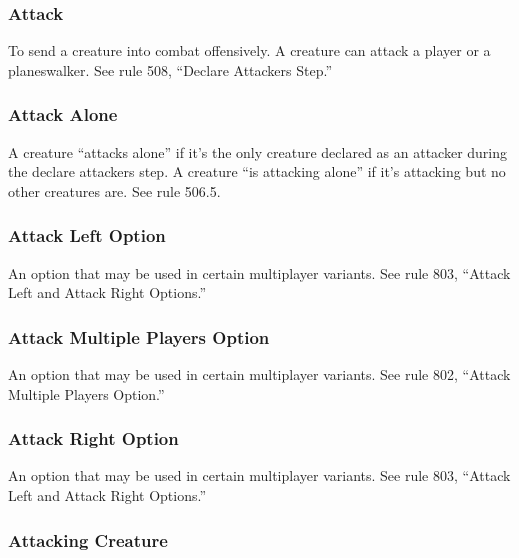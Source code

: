 {\subsubsection*{Attack}

To send a creature into combat offensively. A creature can attack a player or a planeswalker. See rule 508, “Declare Attackers Step.”

\subsubsection*{Attack Alone}

A creature “attacks alone” if it’s the only creature declared as an attacker during the declare attackers step. A creature “is attacking alone” if it’s attacking but no other creatures are. See rule 506.5.

\subsubsection*{Attack Left Option}

An option that may be used in certain multiplayer variants. See rule 803, “Attack Left and Attack Right Options.”

\subsubsection*{Attack Multiple Players Option}

An option that may be used in certain multiplayer variants. See rule 802, “Attack Multiple Players Option.”

\subsubsection*{Attack Right Option}

An option that may be used in certain multiplayer variants. See rule 803, “Attack Left and Attack Right Options.”

\subsubsection*{Attacking Creature}

}
